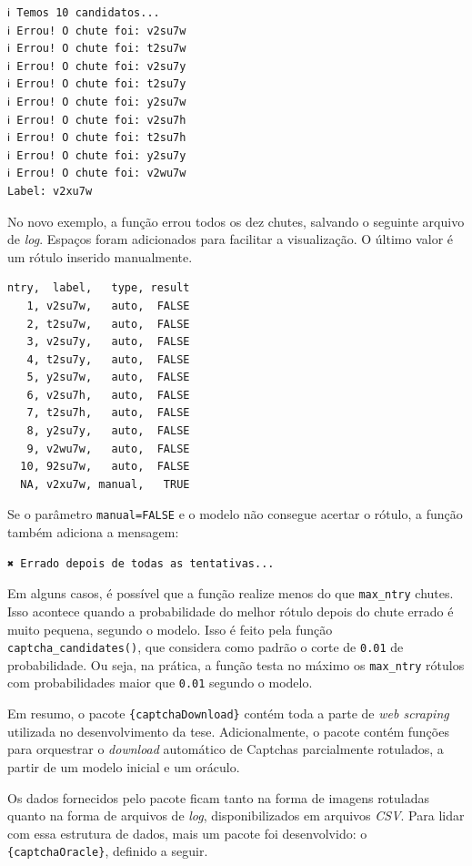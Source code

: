 \documentclass[12pt,twoside,brazilian]{book}
\begin{document}
\begin{verbatim}
ℹ Temos 10 candidatos...
ℹ Errou! O chute foi: v2su7w
ℹ Errou! O chute foi: t2su7w
ℹ Errou! O chute foi: v2su7y
ℹ Errou! O chute foi: t2su7y
ℹ Errou! O chute foi: y2su7w
ℹ Errou! O chute foi: v2su7h
ℹ Errou! O chute foi: t2su7h
ℹ Errou! O chute foi: y2su7y
ℹ Errou! O chute foi: v2wu7w
Label: v2xu7w
\end{verbatim}

No novo exemplo, a função errou todos os dez chutes, salvando o seguinte
arquivo de \emph{log}. Espaços foram adicionados para facilitar a
visualização. O último valor é um rótulo inserido manualmente.

\begin{verbatim}
ntry,  label,   type, result
   1, v2su7w,   auto,  FALSE
   2, t2su7w,   auto,  FALSE
   3, v2su7y,   auto,  FALSE
   4, t2su7y,   auto,  FALSE
   5, y2su7w,   auto,  FALSE
   6, v2su7h,   auto,  FALSE
   7, t2su7h,   auto,  FALSE
   8, y2su7y,   auto,  FALSE
   9, v2wu7w,   auto,  FALSE
  10, 92su7w,   auto,  FALSE
  NA, v2xu7w, manual,   TRUE
\end{verbatim}

Se o parâmetro \texttt{manual=FALSE} e o modelo não consegue acertar o
rótulo, a função também adiciona a mensagem:

\begin{verbatim}
✖ Errado depois de todas as tentativas...
\end{verbatim}

Em alguns casos, é possível que a função realize menos do que
\texttt{max\_ntry} chutes. Isso acontece quando a probabilidade do
melhor rótulo depois do chute errado é muito pequena, segundo o modelo.
Isso é feito pela função \texttt{captcha\_candidates()}, que considera
como padrão o corte de \texttt{0.01} de probabilidade. Ou seja, na
prática, a função testa no máximo os \texttt{max\_ntry} rótulos com
probabilidades maior que \texttt{0.01} segundo o modelo.

Em resumo, o pacote \texttt{\{captchaDownload\}} contém toda a parte de
\emph{web scraping} utilizada no desenvolvimento da tese.
Adicionalmente, o pacote contém funções para orquestrar o
\emph{download} automático de Captchas parcialmente rotulados, a partir
de um modelo inicial e um oráculo.

Os dados fornecidos pelo pacote ficam tanto na forma de imagens
rotuladas quanto na forma de arquivos de \emph{log}, disponibilizados em
arquivos \emph{CSV}. Para lidar com essa estrutura de dados, mais um
pacote foi desenvolvido: o \texttt{\{captchaOracle\}}, definido a
seguir.
\end{document}

